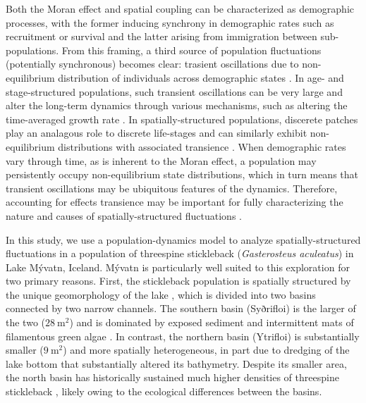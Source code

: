 Both the Moran effect and spatial coupling can be characterized as demographic processes,
with the former inducing synchrony in demographic rates such as recruitment or survival
and the latter arising from immigration between sub-populations.
From this framing,
a third source of population fluctuations (potentially synchronous) becomes clear:
trasient oscillations due to non-equilibrium distribution of individuals across
demographic states
\citep{caswell2001matrix, koons2017understanding}.
In age- and stage-structured populations, 
such transient oscillations can be very large and alter the long-term dynamics 
through various mechanisms,
such as altering the time-averaged growth rate
\citep{tenhumberg2009}. 
In spatially-structured populations, 
discerete patches play an analagous role to discrete life-stages 
and can similarly exhibit non-equilibrium distributions with associated transience
\citep{ozgul2009}.
When demographic rates vary through time,
as is inherent to the Moran effect,
a population may persistently occupy non-equilibrium state distributions,
which in turn means that transient oscillations may be ubiquitous features of the dynamics.
Therefore, accounting for effects transience may be important for 
fully characterizing the nature and causes of spatially-structured fluctuations
\citep{hastings2010}.

In this study, 
we use a population-dynamics model to analyze spatially-structured fluctuations 
in a population of threespine stickleback (\emph{Gasterosteus aculeatus})
in Lake M\'{y}vatn, Iceland.
M\'{y}vatn is particularly well suited to this exploration for two primary reasons.
First, the stickleback population is spatially structured by the unique geomorphology
of the lake \citep{gislason1998, millet2013}, 
which is divided into two basins connected by two narrow channels.
The southern basin (Syðrifloi) is the larger of the two ($28~\text{m}^2$) and is dominated
by exposed sediment and intermittent mats of filamentous green algae
\citep{einarsson2004myvatn}.
In contrast, the northern basin (Ytrifloi) is substantially smaller ($9~\text{m}^2$)
and more spatially heterogeneous, 
in part due to dredging of the lake bottom that substantially altered its bathymetry.
Despite its smaller area, the north basin has historically sustained much higher
densities of threespine stickleback  \citep{gislason1998}, 
likely owing to the ecological differences between the basins. 

